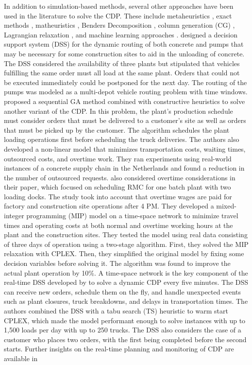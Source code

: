 \documentclass{article}
\begin{document}
In addition to simulation-based methods, several other approaches have been used in the literature to solve the CDP. These include metaheuristics \citep{misir2011selection, maghrebi2016sequential, yang2022concrete}, exact methods \citep{asbach2009analysis, kinable2014concrete}, matheuristics \citep{schmid2009hybrid, schmid2010hybridization}, Benders Decomposition \citep{maghrebi2014benders}, column generation (CG) \citep{maghrebi2014solving, maghrebi2016column}, Lagrangian relaxation \citep{narayanan2015using}, and machine learning approaches \citep{graham2006modeling, maghrebi2016matching}. \cite{matsatsinis2004towards} designed a decision support system (DSS) for the dynamic routing of both concrete and pumps that may be necessary for some construction sites to aid in the unloading of concrete. The DSS considered the availability of three plants but stipulated that vehicles fulfilling the same order must all load at the same plant. Orders that could not be executed immediately could be postponed for the next day. The routing of the pumps was modeled as a multi-depot vehicle routing problem with time windows. \cite{naso2007genetic} proposed a sequential GA method combined with constructive heuristics to solve another variant of the CDP. In this problem, the plant's production schedule must consider orders that must be delivered to a customer's site as well as orders that must be picked up by the customer. The algorithm schedules the plant loading operations first before scheduling the truck deliveries. The authors also developed a non-linear model that minimizes transportation costs, waiting times, outsourced costs, and overtime work. They ran experiments using real-world instances of a concrete supply chain in the Netherlands and found a reduction in the number of outsourced requests. \cite{yan2007optimal} also considered overtime considerations in their paper, which focused on scheduling RMC for one batch plant with two loading docks. The study took into account that overtime wages are paid for factory and construction site operations after 4 PM. They developed a mixed-integer programming (MIP) model on a time-space network to minimize travel times and operating costs at both normal and overtime working hours at the plant and the construction sites. They tested the model using real data consisting of three days of operation using a two-stage algorithm. First, they solved the MIP relaxation with CPLEX. Then, they simplified the original model by fixing some decision variables before solving it. The algorithm was found to improve the actual plant operation by 10\%. A time-space network is the key component of the real-time DSS developed by \cite{durbin2008or} to solve a dynamic CDP every five minutes. The DSS can receive new orders, schedule them on the fly, and handle unexpected events such as plant closures, truck breakdowns, and delays in transportation times. The authors combined the DSS with a tabu search (TS) heuristic to warm start CPLEX, which made the model performant enough to solve instances with up to 1,500 loads per day with up to 250 trucks. The DSS also considers the case of a customer who places two orders, with the first being completed before the second starts. Further insights on the real-time planning and monitoring of CDP are available in 
\end{document}
